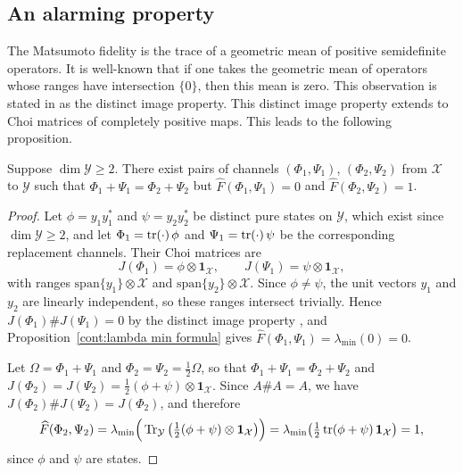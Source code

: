 \subsection{An alarming property}
 
The Matsumoto fidelity is the trace of a geometric mean of positive semidefinite operators. It is well-known that if one takes the geometric mean of operators whose ranges have intersection $\{0\}$, then this mean is zero. This observation is stated in \cite{cree2020fidelity} as the distinct image property. This distinct image property extends to Choi matrices of completely positive maps. This leads to the following proposition. 
 
\begin{proposition}\label{cont:impossibility proposition}
   Suppose $\dim\mathcal{Y}\geq 2$. There exist pairs of channels $(\Phi_1,\Psi_1)$, $(\Phi_2,\Psi_2)$ from $\mathcal{X}$ to $\mathcal{Y}$ such that $\Phi_1+\Psi_1=\Phi_2+\Psi_2$ but $\widehat{F}(\Phi_1,\Psi_1)=0$ and $\widehat{F}(\Phi_2,\Psi_2)=1$.  
\end{proposition}
\begin{proof}
Let $\phi=y_1y_1^*$ and $\psi=y_2y_2^*$ be distinct pure states on $\mathcal{Y}$, which exist since $\dim\mathcal{Y}\geq2$, and let $\Phi_1=\operatorname{tr}(\cdot)\,\phi$ and $\Psi_1=\operatorname{tr}(\cdot)\,\psi$ be the corresponding replacement channels. Their Choi matrices are
\[
J(\Phi_1)=\phi\otimes\mathbf{1}_{\mathcal{X}},\qquad J(\Psi_1)=\psi\otimes\mathbf{1}_{\mathcal{X}},
\]
with ranges $\mathrm{span}\{y_1\}\otimes\mathcal{X}$ and $\mathrm{span}\{y_2\}\otimes\mathcal{X}$. Since $\phi\neq\psi$, the unit vectors $y_1$ and $y_2$ are linearly independent, so these ranges intersect trivially. Hence $J(\Phi_1)\#J(\Psi_1)=0$ by the distinct image property \cite{cree2020fidelity}, and Proposition~\ref{cont:lambda min formula} gives $\widehat{F}(\Phi_1,\Psi_1)=\lambda_{\min}(0)=0$.
 
Let $\Omega=\Phi_1+\Psi_1$ and $\Phi_2=\Psi_2=\tfrac12\Omega$, so that $\Phi_1+\Psi_1=\Phi_2+\Psi_2$ and $J(\Phi_2)=J(\Psi_2)=\tfrac12(\phi+\psi)\otimes\mathbf{1}_{\mathcal{X}}$. Since $A\#A=A$, we have $J(\Phi_2)\#J(\Psi_2)=J(\Phi_2)$, and therefore
\[
\widehat{F}(\Phi_2,\Psi_2)=\lambda_{\min}\Big(\operatorname{Tr}_{\mathcal{Y}}\big(\tfrac12(\phi+\psi)\otimes\mathbf{1}_{\mathcal{X}}\big)\Big)=\lambda_{\min}\big(\tfrac12\operatorname{tr}(\phi+\psi)\,\mathbf{1}_{\mathcal{X}}\big)=1,
\]
since $\phi$ and $\psi$ are states.
\end{proof}
 
